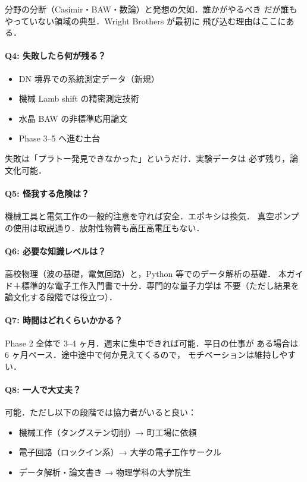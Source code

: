 \documentclass[11pt,a4paper]{article}
\begin{document}
分野の分断（Casimir・BAW・数論）と発想の欠如．誰かがやるべき
だが誰もやっていない領域の典型．Wright Brothers が最初に
飛び込む理由はここにある．

\paragraph{Q4: 失敗したら何が残る？}

\begin{itemize}
\item DN 境界での系統測定データ（新規）
\item 機械 Lamb shift の精密測定技術
\item 水晶 BAW の非標準応用論文
\item Phase 3--5 へ進む土台
\end{itemize}

失敗は「プラトー発見できなかった」というだけ．実験データは
必ず残り，論文化可能．

\paragraph{Q5: 怪我する危険は？}

機械工具と電気工作の一般的注意を守れば安全．エポキシは換気．
真空ポンプの使用は取説通り．放射性物質も高圧高電圧もない．

\paragraph{Q6: 必要な知識レベルは？}

高校物理（波の基礎，電気回路）と，Python 等でのデータ解析の基礎．
本ガイド＋標準的な電子工作入門書で十分．専門的な量子力学は
不要（ただし結果を論文化する段階では役立つ）．

\paragraph{Q7: 時間はどれくらいかかる？}

Phase 2 全体で 3--4 ヶ月．週末に集中できれば可能．平日の仕事が
ある場合は 6 ヶ月ペース．途中途中で何か見えてくるので，
モチベーションは維持しやすい．

\paragraph{Q8: 一人で大丈夫？}

可能．ただし以下の段階では協力者がいると良い：
\begin{itemize}
\item 機械工作（タングステン切削）→ 町工場に依頼
\item 電子回路（ロックイン系）→ 大学の電子工作サークル
\item データ解析・論文書き → 物理学科の大学院生
\end{itemize}
\end{document}
